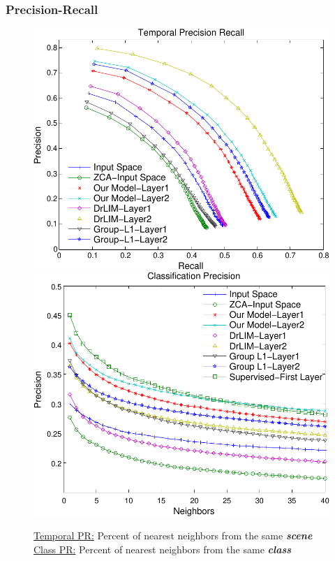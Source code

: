\documentclass{beamer}
\begin{document}
\begin{frame}
\frametitle{Precision-Recall}
\begin{center} 
\begin{figure}
\includegraphics[scale=0.40]{./Figures/Project1/AUC_time-crop.pdf}
\includegraphics[scale=0.40]{./Figures/Project1/AUC_class-crop.pdf} 
\caption{\underline{Temporal PR:} Percent of nearest neighbors from the same \textbf{\emph{scene}} \\
\hspace{1.15cm}\underline{Class PR:} Percent of nearest neighbors from the same \textbf{\emph{class}} }
\end{figure}
\end{center}  
\end{frame} 
\end{document}
